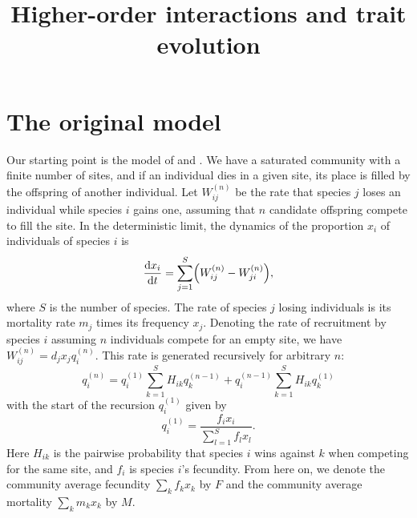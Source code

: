\documentclass[11pt]{article}
\newcommand{\ud}{\text{d}}
\let\originalleft\left
\let\originalright\right
\renewcommand{\left}{\mathopen{}\mathclose\bgroup\originalleft}
\renewcommand{\right}{\aftergroup\egroup\originalright}
\begin{document}
\title{Higher-order interactions and trait evolution}
\author{}
\date{}

\maketitle


\section{The original model} \label{sec:model_original}

Our starting point is the model of \cite{Grillietal2017} and \cite{Maynardetal2019}. We have a saturated community with a finite number of sites, and if an individual dies in a given site, its place is filled by the offspring of another individual. Let $W_{ij}^{(n)}$ be the rate that species $j$ loses an individual while species $i$ gains one, assuming that $n$ candidate offspring compete to fill the site. In the deterministic limit, the dynamics of the proportion $x_i$ of individuals of species $i$ is
\begin{equation}
  \label{eq:Wbasic}
  \frac{\ud x_i}{\ud t} = \sum_{j=1}^S
  \left( W_{ij}^{(n)} - W_{ji}^{(n)} \right) ,
\end{equation}
where $S$ is the number of species. The rate of species $j$ losing individuals is its mortality rate $m_j$ times its frequency $x_j$. Denoting the rate of recruitment by species $i$ assuming $n$ individuals compete for an empty site, we have $W_{ij}^{(n)} = d_j x_j q_i^{(n)}$. This rate is generated recursively for arbitrary $n$:
\begin{equation}
  \label{eq:qinbasic}
  q_i^{(n)} = q_i^{(1)} \sum_{k=1}^S H_{ik} q_k^{(n-1)} +
  q_i^{(n-1)} \sum_{k=1}^S H_{ik} q_k^{(1)}
\end{equation}
with the start of the recursion $q_i^{(1)}$ given by
\begin{equation}
  \label{eq:qi1basic}
  q_i^{(1)} = \frac{f_i x_i}{\sum_{l=1}^S f_l x_l} .
\end{equation}
Here $H_{ik}$ is the pairwise probability that species $i$ wins against $k$ when competing for the same site, and $f_i$ is species $i$'s fecundity. From here on, we denote the community average fecundity $\sum_k f_k x_k$ by $F$ and the community average mortality $\sum_k m_k x_k$ by $M$.
\end{document}
